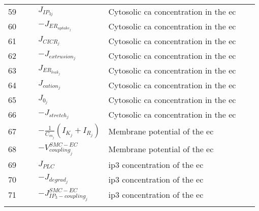 \documentclass[]{article}
\newcommand{\na}{\gls{na}\xspace}
\newcommand{\pot}{\gls{pot}\xspace}
\newcommand{\ca}{\gls{ca}\xspace}
\newcommand{\ip}{\gls{ip3}\xspace}
\begin{document}
\begin{longtable}[h!] { p{0.12\linewidth}  p{0.28\linewidth}     p{0.6\linewidth} }
 59 &    $ J_{IP_{3j}}$ & Cytosolic \ca concentration in the \gls{ec} \\
 60 &    $- J_{ER_{uptake_{j}}} $ &  Cytosolic \ca concentration in the \gls{ec}\\
 61 &    $J_{CICR_{j}} $ &Cytosolic \ca concentration in the \gls{ec} \\
 62 &    $- J_{extrusion_{j}} $ & Cytosolic \ca concentration in the \gls{ec}\\
 63 &    $J_{ER_{leak_{j}}} $ &Cytosolic \ca concentration in the \gls{ec} \\
 64 &    $ J_{cation_{j}}$ & Cytosolic \ca concentration in the \gls{ec}\\
 65 &    $ J_{0_{j}}$ & Cytosolic \ca concentration in the \gls{ec}\\
 66 &    $- J_{stretch_{j}} $ &Cytosolic \ca concentration in the \gls{ec} \\
 67 &    $-\frac{1}{C_{m_{j}}} ( I_{K_{j}}+I_{R_{j}}) $ & Membrane potential of the \gls{ec} \\
 68 &    $- V^{SMC-EC}_{coupling_{j}} $ &  Membrane potential of the \gls{ec}\\
 69 &    $ J_{PLC}$ &\ip concentration of the \gls{ec} \\
 70 &    $- J_{degrad_{j}}  $ &\ip concentration of the \gls{ec} \\
 71 &    $- J^{SMC-EC}_{IP_{3}-coupling_{j}}$ & \ip concentration of the \gls{ec}\\
	\hline
	\label{tab:table1}
\end{longtable}
\end{document}
